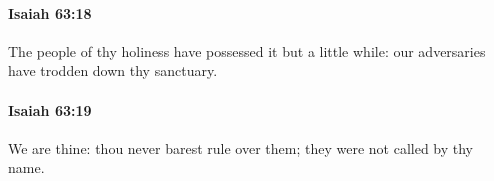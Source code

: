 		\paragraph{Isaiah 63:18} %
			\label{ISAIAH-63-18}

			The people of thy holiness have possessed it but a little while: our adversaries have trodden down thy sanctuary.


		\paragraph{Isaiah 63:19} %
			\label{ISAIAH-63-19}

			We are thine: thou never barest rule over them; they were not called by thy name.


